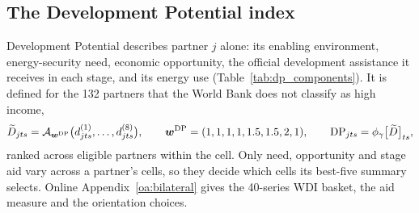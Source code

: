 \subsection{The Development Potential index}\label{subsec:development_potential}

Development Potential describes partner $j$ alone: its enabling environment, energy-security need,
economic opportunity, the official development assistance it receives in each stage, and its energy
use (Table~\ref{tab:dp_components}). It is defined for the 132 partners that the World Bank does not
classify as high income,
\begin{equation}\label{eq:dp_index}
  \widetilde D_{jts}=\mathcal{A}_{\bm w^{\mathrm{DP}}}\bigl(d^{(1)}_{jts},\dots,d^{(8)}_{jts}\bigr),\qquad
  \bm w^{\mathrm{DP}}=(1,1,1,1,1.5,1.5,2,1),\qquad
  \mathrm{DP}_{jts}={\phi_{\gamma}}\bigl[\widetilde D\bigr]_{ts},
\end{equation}
ranked across eligible partners within the cell. Only need, opportunity and stage aid vary across a
partner's cells, so they decide which cells its best-five summary selects. Online
Appendix~\ref{oa:bilateral} gives the 40-series WDI basket, the aid measure and the orientation
choices.

